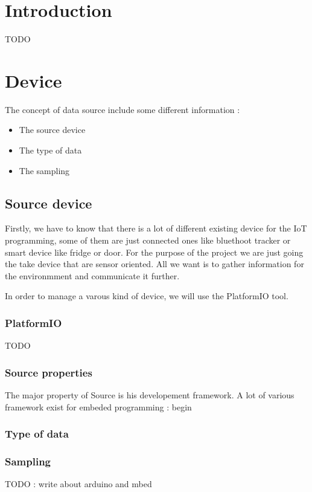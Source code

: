 \label{chap:dsl_design}

\section{Introduction}
\label{sec:design_intro}

TODO

\section{Device}
\label{sec:dsl-design-data-source}

The concept of data source include some different information :

\begin{itemize}
\item The source device
\item The type of data
\item The sampling
\end{itemize}

\subsection{Source device}
\label{subsec:dsl-design-source-device}

Firstly, we have to know that there is a lot of different existing device for
the IoT programming, some of them are just connected ones like bluethoot tracker
or smart device like fridge or door. For the purpose of the project we are just
going the take device that are sensor oriented. All we want is to gather
information for the environmment and communicate it further.

In order to manage a varous kind of device, we will use the PlatformIO tool.

\subsubsection{PlatformIO}
\label{sec:dsl-design-source-device-platformio}

TODO

\subsubsection{Source properties}
\label{sec:dsl-design-source-properties}

The major property of Source is his developement framework. A lot of various framework exist for embeded programming :
begin

\subsubsection{Type of data}
\label{sec:dsl-design-type-of-data}

\subsubsection{Sampling}
\label{sec:dsl-design-sampling}


TODO : write about arduino and mbed


